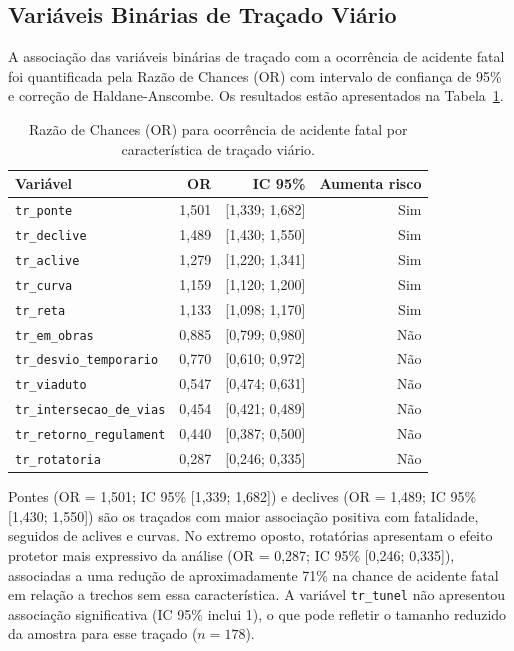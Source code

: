\documentclass[12pt]{article}
\begin{document}
\subsection{Variáveis Binárias de Traçado Viário}

A associação das variáveis binárias de traçado com a ocorrência de
acidente fatal foi quantificada pela Razão de Chances (OR) com
intervalo de confiança de 95\% e correção de Haldane-Anscombe.
Os resultados estão apresentados na Tabela~\ref{tab:odds_ratio}.

\begin{table}[ht]
\centering
\caption{Razão de Chances (OR) para ocorrência de acidente fatal
  por característica de traçado viário.}
\label{tab:odds_ratio}
\small
\begin{tabular}{lrrr}
\toprule
\textbf{Variável} & \textbf{OR} & \textbf{IC 95\%} &
  \textbf{Aumenta risco} \\
\midrule
\texttt{tr\_ponte}               & 1,501 & {[1,339; 1,682]} & Sim \\
\texttt{tr\_declive}             & 1,489 & {[1,430; 1,550]} & Sim \\
\texttt{tr\_aclive}              & 1,279 & {[1,220; 1,341]} & Sim \\
\texttt{tr\_curva}               & 1,159 & {[1,120; 1,200]} & Sim \\
\texttt{tr\_reta}                & 1,133 & {[1,098; 1,170]} & Sim \\
\texttt{tr\_em\_obras}           & 0,885 & {[0,799; 0,980]} & Não \\
\texttt{tr\_desvio\_temporario}  & 0,770 & {[0,610; 0,972]} & Não \\
\texttt{tr\_viaduto}             & 0,547 & {[0,474; 0,631]} & Não \\
\texttt{tr\_intersecao\_de\_vias}& 0,454 & {[0,421; 0,489]} & Não \\
\texttt{tr\_retorno\_regulament} & 0,440 & {[0,387; 0,500]} & Não \\
\texttt{tr\_rotatoria}           & 0,287 & {[0,246; 0,335]} & Não \\
\bottomrule
\end{tabular}
\end{table}

Pontes (OR = 1,501; IC 95\% [1,339; 1,682]) e declives
(OR = 1,489; IC 95\% [1,430; 1,550]) são os traçados com maior
associação positiva com fatalidade, seguidos de aclives e curvas.
No extremo oposto, rotatórias apresentam o efeito protetor mais
expressivo da análise (OR = 0,287; IC 95\% [0,246; 0,335]),
associadas a uma redução de aproximadamente 71\% na chance de
acidente fatal em relação a trechos sem essa característica. A
variável \texttt{tr\_tunel} não apresentou associação significativa
(IC 95\% inclui 1), o que pode refletir o tamanho reduzido da
amostra para esse traçado ($n = 178$).
\end{document}
